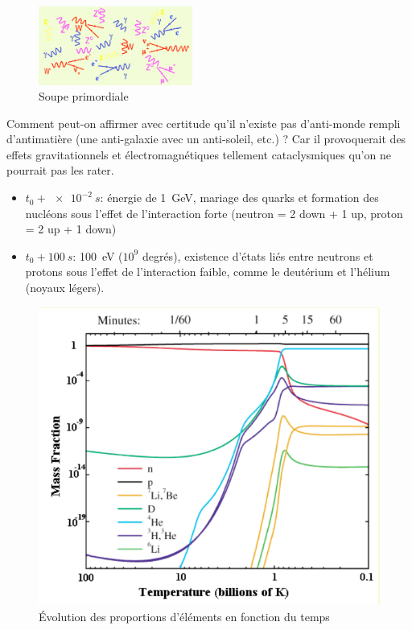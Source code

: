 \begin{figure}[ht]
    \centering
    \includegraphics[width=0.45\textwidth]{Images1/soupe.png}
    \caption{Soupe primordiale}
    \label{fig:soupe_promordiale}
\end{figure}

\begin{rem}
    Comment peut-on affirmer avec certitude qu'il n'existe pas d'anti-monde rempli d'antimatière (une anti-galaxie avec un anti-soleil, etc.) ? Car il provoquerait des effets gravitationnels et électromagnétiques tellement cataclysmiques qu'on ne pourrait pas les rater.
\end{rem}

\begin{itemize}
    \item $t_0 + \SI{e-2}{s}$: énergie de \SI{1}{GeV}, mariage des quarks et formation des nucléons sous l'effet de l'interaction forte (neutron = 2 down + 1 up, proton = 2 up + 1 down)
    \item $t_0+ \SI{100}{s}$: \SI{100}{eV} ($10^9$ degrés), existence d'états liés entre neutrons et protons sous l'effet de l'interaction faible, comme le deutérium et l'hélium (noyaux légers).
\end{itemize}

\begin{figure}[ht]
    \centering
    \includegraphics[scale=0.50]{Images1/tempmass.png}
    \caption{Évolution des proportions d'éléments en fonction du temps}
\end{figure}


